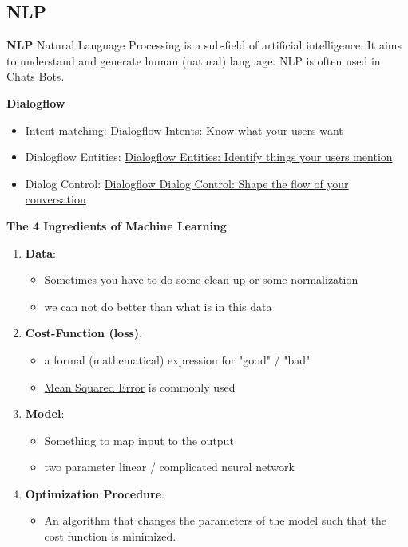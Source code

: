 \documentclass[11pt,twoside,landscape]{article}
\begin{document}
\begin{multicols}{3}
\section{NLP}
\label{sec:orgcee4e4b}
\textbf{NLP}
Natural Language Processing is a sub-field of artificial intelligence.
It aims to understand and generate human (natural) language.
NLP is often used in Chats Bots.

\textbf{Dialogflow}
\begin{itemize}
\item Intent matching: \href{https://www.youtube.com/watch?v=9aHusGxntPw}{Dialogflow Intents: Know what your users want}
\item Dialogflow Entities: \href{https://www.youtube.com/watch?v=kzdL6GxJ\_WY}{Dialogflow Entities: Identify things your users mention}
\item Dialog Control: \href{https://youtu.be/-tOamKtmxdY}{Dialogflow Dialog Control: Shape the flow of your conversation}
\end{itemize}



\textbf{The 4 Ingredients of Machine Learning}
\begin{enumerate}
\item \textbf{Data}:
\begin{itemize}
\item Sometimes you have to do some clean up or some normalization
\item we can not do better than what is in this data
\end{itemize}
\item \textbf{Cost-Function (loss)}:
\begin{itemize}
\item a formal (mathematical) expression for "good" / "bad"
\item \href{../../../roam/20211004175550-mean_squared_error.org}{Mean Squared Error} is commonly used
\end{itemize}
\item \textbf{Model}:
\begin{itemize}
\item Something to map input to the output
\item two parameter linear / complicated neural network
\end{itemize}
\item \textbf{Optimization Procedure}:
\begin{itemize}
\item An algorithm that changes the parameters of the model such that the cost function is minimized.
\end{itemize}
\end{enumerate}


\end{multicols}
\end{document}
